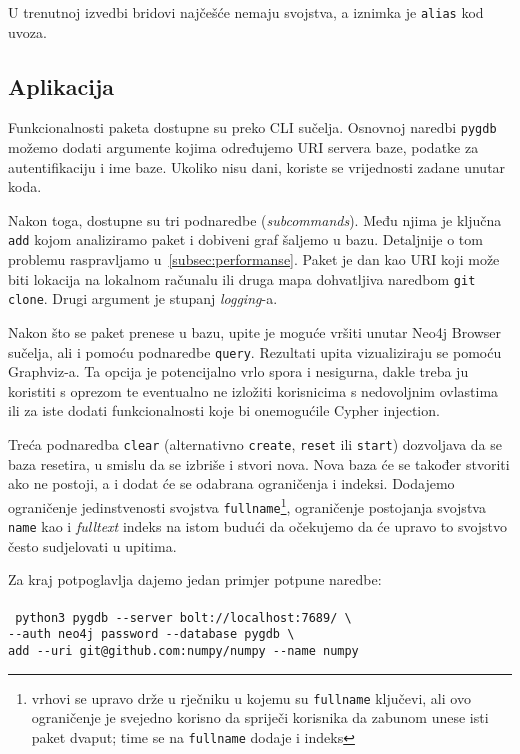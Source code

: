 U trenutnoj izvedbi bridovi najčešće nemaju svojstva, a iznimka je \texttt{alias} kod uvoza.

\newpage
\subsection{Aplikacija}
Funkcionalnosti paketa dostupne su preko CLI sučelja. Osnovnoj naredbi \texttt{pygdb}
možemo dodati argumente kojima određujemo URI servera baze, podatke za autentifikaciju
i ime baze. Ukoliko nisu dani, koriste se vrijednosti zadane unutar koda. 

Nakon toga, dostupne su tri podnaredbe (\textsl{subcommands}). Među njima je ključna
\texttt{add} kojom analiziramo paket i dobiveni graf šaljemo u bazu. Detaljnije
o tom problemu raspravljamo u~\ref{subsec:performanse}. Paket je
dan kao URI koji može biti lokacija na lokalnom računalu ili druga mapa 
dohvatljiva naredbom \texttt{git\- clone}. Drugi argument je stupanj \emph{logging}-a.

Nakon što se paket prenese u bazu, upite je moguće vršiti unutar Neo4j Browser sučelja,
ali i pomoću podnaredbe
\texttt{query}. Rezultati upita vizualiziraju se pomoću Graphviz-a. Ta opcija
je potencijalno vrlo spora i nesigurna, dakle treba ju koristiti s oprezom
te eventualno ne izložiti korisnicima s nedovoljnim ovlastima ili za 
iste dodati funkcionalnosti koje bi onemogućile Cypher injection.

Treća podnaredba \texttt{clear} (alternativno \texttt{create}, \texttt{reset} ili \texttt{start})
dozvoljava da se baza resetira, u smislu da se izbriše i stvori nova. Nova baza će se također stvoriti
ako ne postoji, a i dodat će se odabrana ograničenja i indeksi. Dodajemo ograničenje jedinstvenosti svojstva
\texttt{fullname}\footnote{vrhovi se upravo drže u rječniku u kojemu su \texttt{fullname} ključevi,
ali ovo ograničenje je svejedno korisno da spriječi korisnika da zabunom
unese isti paket dvaput; time se na \texttt{fullname} dodaje i indeks}, ograničenje
postojanja svojstva \texttt{name} kao i \emph{fulltext} indeks na istom
budući da očekujemo da će upravo to svojstvo često sudjelovati u upitima.

Za kraj potpoglavlja dajemo jedan primjer potpune naredbe: \\ \\
\texttt{
	python3 pygdb -{}-server bolt:\slash\slash localhost:7689\slash\ \textbackslash \\
	-{}-auth neo4j password -{}-database pygdb \textbackslash \\
	add -{}-uri git@github.com:numpy\slash numpy -{}-name numpy}

